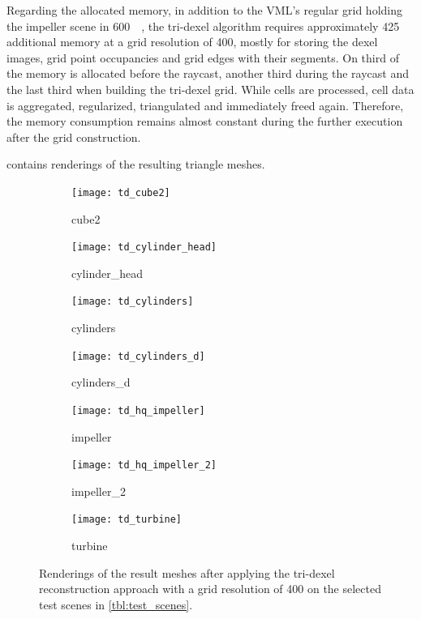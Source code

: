 Regarding the allocated memory, in addition to the VML's regular grid holding the impeller scene in \SI{600}{\mebi\byte}, the tri-dexel algorithm requires approximately \SI{425}{\mebi\byte} additional memory at a grid resolution of 400, mostly for storing the dexel images, grid point occupancies and grid edges with their segments.
On third of the memory is allocated before the raycast, another third during the raycast and the last third when building the tri-dexel grid.
While cells are processed, cell data is aggregated, regularized, triangulated and immediately freed again.
Therefore, the memory consumption remains almost constant during the further execution after the grid construction.

 contains renderings of the resulting triangle meshes.
%
\begin{figure}
	\centering
	\begin{subfigure}[b]{0.34\textwidth}
		\centering
		\texttt{[image: td\_cube2]}
		\caption{cube2}
		\label{fig:td_cube2}
	\end{subfigure}
	\hspace{1cm}
	\begin{subfigure}[b]{0.34\textwidth}
		\centering
		\texttt{[image: td\_cylinder\_head]}
		\caption{cylinder\_head}
		\label{fig:td_cylinder_head}
	\end{subfigure}
	\begin{subfigure}[b]{0.34\textwidth}
		\centering
		\texttt{[image: td\_cylinders]}
		\caption{cylinders}
		\label{fig:td_cylinders}
	\end{subfigure}
	\hspace{1cm}
	\begin{subfigure}[b]{0.34\textwidth}
		\centering
		\texttt{[image: td\_cylinders\_d]}
		\caption{cylinders\_d}
		\label{fig:td_cylinders_delaunay}
	\end{subfigure}
	\begin{subfigure}[b]{0.34\textwidth}
		\centering
		\texttt{[image: td\_hq\_impeller]}
		\caption{impeller}
		\label{fig:td_hq_impeller}
	\end{subfigure}
	\hspace{1cm}
	\begin{subfigure}[b]{0.34\textwidth}
		\centering
		\texttt{[image: td\_hq\_impeller\_2]}
		\caption{impeller\_2}
		\label{fig:td_hq_impeller_2}
	\end{subfigure}
	\begin{subfigure}[b]{0.33\textwidth}
		\centering
		\texttt{[image: td\_turbine]}
		\caption{turbine}
		\label{fig:td_turbine}
	\end{subfigure}
	\caption{
		Renderings of the result meshes after applying the tri-dexel reconstruction approach with a grid resolution of 400 on the selected test scenes in \cref{tbl:test_scenes}.
	}
	\label{fig:td_results}
\end{figure}
